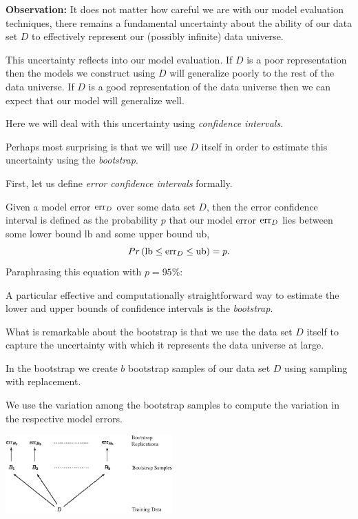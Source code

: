 \documentclass[a4paper,blends,pdf,colorBG,slideColor]{prosper}
\begin{document}
\vspace{.2in}
{\bf Observation:} It does not matter how careful we are with our model evaluation techniques,
there remains a fundamental uncertainty about the ability of our data set $D$ to effectively
represent our (possibly infinite) data universe.

This uncertainty reflects into our model evaluation.  If $D$ is a poor representation then
the models we construct using $D$ will generalize poorly to the rest of the data universe.  If
$D$ is a good representation of the data universe then we can expect that our model will
generalize well.

Here we will deal with this uncertainty using {\em confidence intervals}.

Perhaps most surprising is that we will use $D$ itself in order to estimate this uncertainty using
the {\em bootstrap}.
\es

First, let us define {\em error confidence intervals} formally.

Given a model error $\mbox{err}_D$ over some data set $D$,  then
the error confidence interval is defined as  the probability $p$ that our model error $\mbox{err}_D$ lies between some lower bound $\text{lb}$ and some upper bound $\text{ub}$,
\begin{equation*}
Pr\left(\text{lb} \le \mbox{err}_D \le \text{ub}\right) = p.
\end{equation*}
Paraphrasing this equation with $p=95\%$: 
\begin{center}
\end{center}
\es

\small
A particular effective and computationally straightforward way to estimate the lower and upper bounds of confidence intervals is the {\em bootstrap}.  

What is remarkable about the bootstrap is that we use the data set $D$ itself to capture the uncertainty
with which it represents the data universe at large.

In the bootstrap we create $b$ bootstrap samples of our data set $D$  using sampling with replacement.

We use the variation among the bootstrap samples to compute the variation in the respective model errors.

\vspace{.2in}
\begin{center}
\includegraphics[height=30mm]{figures/fig09-03.eps}
\end{center}
\es
\end{document}

